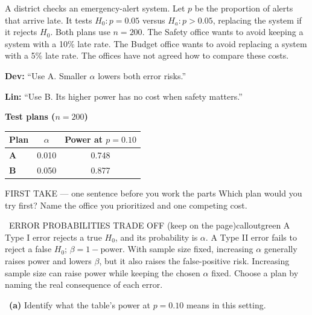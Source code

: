 \documentclass[11pt]{article}
\begin{document}
A district checks an emergency-alert system. Let $p$ be the proportion of alerts that arrive late. It tests $H_0:p=0.05$ versus $H_a:p>0.05$, replacing the system if it rejects $H_0$. Both plans use $n=200$. The Safety office wants to avoid keeping a system with a 10\% late rate. The Budget office wants to avoid replacing a system with a 5\% late rate. The offices have not agreed how to compare these costs.\par\smallskip \textbf{Dev:} ``Use A. Smaller $\alpha$ lowers both error risks.''\par \textbf{Lin:} ``Use B. Its higher power has no cost when safety matters.''\par
\begin{center}
\textbf{Test plans ($n=200$)}\par\smallskip
\begin{tabular}{|l|c|c|}
\hline
\textbf{Plan} & \textbf{$\alpha$} & \textbf{Power at $p=0.10$} \\ \hline
\textbf{A} & 0.010 & 0.748 \\ \hline
\textbf{B} & 0.050 & 0.877 \\ \hline
\end{tabular}
\end{center}
\begin{firsttakebox}{FIRST TAKE --- one sentence before you work the parts}
Which plan would you try first? Name the office you prioritized and one competing cost.\par
{}
\end{firsttakebox}

\begin{callout}{\IconBook\ ERROR PROBABILITIES TRADE OFF (keep on the page)}{calloutgreen}
A Type I error rejects a true $H_0$, and its probability is $\alpha$. A Type II error fails to reject a false
$H_0$; $\beta=1-\text{power}$. With sample size fixed, increasing $\alpha$ generally raises power and lowers
$\beta$, but it also raises the false-positive risk. Increasing sample size can raise power while keeping the
chosen $\alpha$ fixed. Choose a plan by naming the real consequence of each error.
\end{callout}

~\textbf{(a)} Identify what the table's power at $p=0.10$ means in this setting.\par
{}
\end{document}
